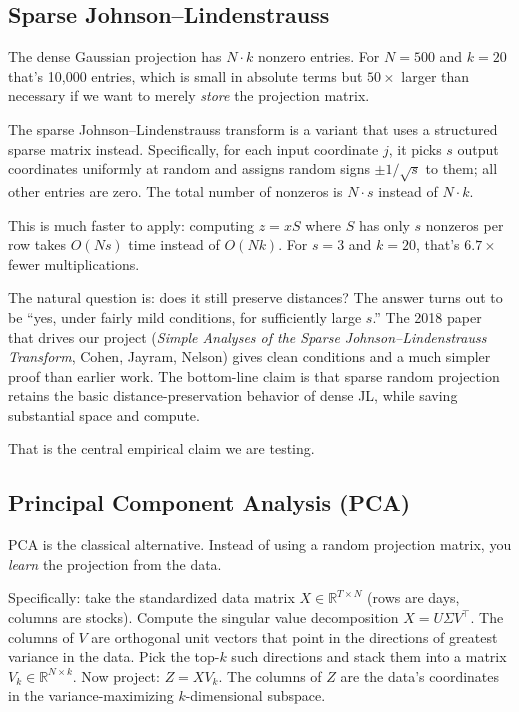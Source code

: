 \documentclass[11pt]{article}
\begin{document}
\subsection{Sparse Johnson--Lindenstrauss}

The dense Gaussian projection has $N \cdot k$ nonzero entries. For $N = 500$ and $k = 20$ that's 10{,}000 entries, which is small in absolute terms but $50\times$ larger than necessary if we want to merely \emph{store} the projection matrix.

The sparse Johnson--Lindenstrauss transform is a variant that uses a structured sparse matrix instead. Specifically, for each input coordinate $j$, it picks $s$ output coordinates uniformly at random and assigns random signs $\pm 1/\sqrt{s}$ to them; all other entries are zero. The total number of nonzeros is $N \cdot s$ instead of $N \cdot k$.

This is much faster to apply: computing $z = x S$ where $S$ has only $s$ nonzeros per row takes $O(N s)$ time instead of $O(N k)$. For $s=3$ and $k=20$, that's $6.7\times$ fewer multiplications.

The natural question is: does it still preserve distances? The answer turns out to be ``yes, under fairly mild conditions, for sufficiently large $s$.'' The 2018 paper that drives our project (\emph{Simple Analyses of the Sparse Johnson--Lindenstrauss Transform}, Cohen, Jayram, Nelson) gives clean conditions and a much simpler proof than earlier work. The bottom-line claim is that sparse random projection retains the basic distance-preservation behavior of dense JL, while saving substantial space and compute.

That is the central empirical claim we are testing.

\subsection{Principal Component Analysis (PCA)}

PCA is the classical alternative. Instead of using a random projection matrix, you \emph{learn} the projection from the data.

Specifically: take the standardized data matrix $X \in \mathbb{R}^{T \times N}$ (rows are days, columns are stocks). Compute the singular value decomposition $X = U \Sigma V^\top$. The columns of $V$ are orthogonal unit vectors that point in the directions of greatest variance in the data. Pick the top-$k$ such directions and stack them into a matrix $V_k \in \mathbb{R}^{N \times k}$. Now project: $Z = X V_k$. The columns of $Z$ are the data's coordinates in the variance-maximizing $k$-dimensional subspace.
\end{document}

